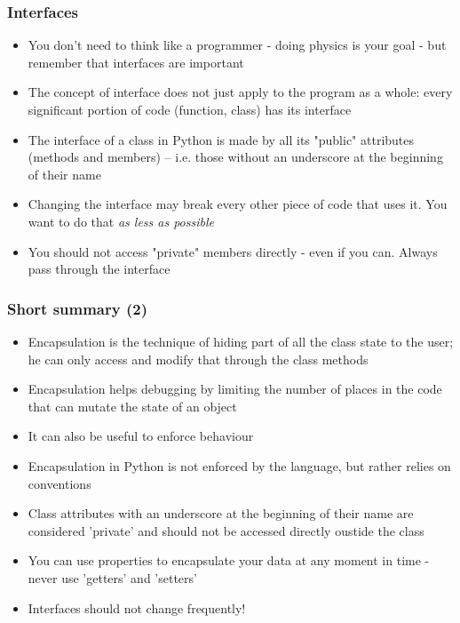 \documentclass[9pt]{beamer}
\begin{document}
 
\begin{frame}
  \frametitle{Interfaces}
    
  \begin{itemize}
    \item You don't need to think like a programmer - doing physics is your goal - but
          remember that \alert{interfaces are important}
    \medskip
    \item The concept of interface does not just apply to the program as a whole:
          every significant portion of code (function, class) has its interface
    \medskip
    \item The interface of a class in Python is made by all its "public" attributes (methods and members)
          -- i.e. those without an underscore at the beginning of their name
    \medskip
    \item Changing the interface may break every other piece of code that uses it.
          You want to do that \emph{as less as possible}
    \medskip
    \item You should not access "private" members directly - even if you can. Always
          pass through the interface
    
  \end{itemize}

\end{frame}


\begin{frame}
  \frametitle{Short summary (2)}
    
  \begin{itemize}
    \small
    \item Encapsulation is the technique of hiding part of all the class state to the user; 
          he can only access and modify that through the class methods
    \medskip
    \item Encapsulation helps debugging by limiting the number of places in the code
          that can mutate the state of an object
    \medskip
    \item It can also be useful to enforce behaviour  
    \medskip
    \item Encapsulation in Python is not enforced by the language, but rather relies on conventions
    \medskip
    \item Class attributes with an underscore at the beginning of their name are
          considered 'private' and should not be accessed directly oustide the class
    \smallskip
    \item You can use properties to encapsulate your data at any moment in time - never use 'getters' and 'setters'
    \medskip
    \item Interfaces should not change frequently!
  \end{itemize}
  
\end{frame}
\end{document}
